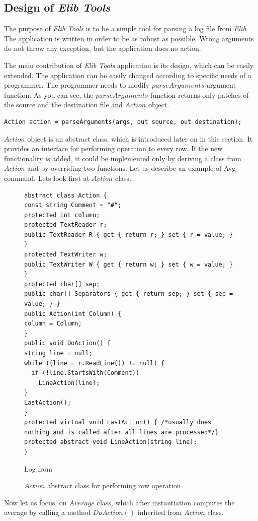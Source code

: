 \subsection*{Design of {\it Elib Tools}}\label{sec:design}
  The purpose of {\it Elib Tools} is to be a simple tool for parsing a log file from {\it Elib}.
  The application is written in order to be as robust as possible.
  Wrong arguments do not throw any exception, but the application does no action.

  The main contribution of {\it Elib Tools} application is its design, which can be easily extended.
  The application can be easily changed according to specific needs of a programmer.
  The programmer needs to modify $parseArguments$ argument function.
  As you can see, the $parseArguments$ function returns only patches 
  of the source and the destination file and $Action$ object.
\begin{lstlisting}
Action action = parseArguments(args, out source, out destination);
\end{lstlisting}
  
  $Action$ object is an abstract class, which is introduced later on in this section. It provides
  an interface for performing operation to every row.
  If the new functionality is added, it could be implemented only by deriving 
  a class from $Action$ and by overriding
  two functions. Let us describe an example of Avg command. Lets look first at $Action$ class.
\begin{figure}[!hbp]
\begin{lstlisting}
abstract class Action {
const string Comment = "#";
protected int column;
protected TextReader r;
public TextReader R { get { return r; } set { r = value; } }
protected TextWriter w;
public TextWriter W { get { return w; } set { w = value; } }
protected char[] sep;
public char[] Separators { get { return sep; } set { sep = value; } }
public Action(int Column) {
column = Column;
}
public void DoAction() {
string line = null;
while ((line = r.ReadLine()) != null) {
  if (!line.StartsWith(Comment))
    LineAction(line);
}
LastAction();
}
protected virtual void LastAction() { /*usually does nothing and is called after all lines are processed*/}
protected abstract void LineAction(string line);
}
\end{lstlisting}

  Log from 
\caption{$Action$ abstract class for performing row operation}\label{action}
\end{figure}

  Now let us focus, on $Average$ class, which after instantiation computes the average by calling a method $DoAction()$
  inherited from $Action$ class. 

